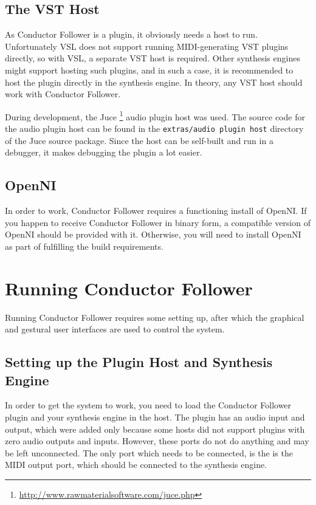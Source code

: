 \documentclass[12pt,a4paper]{article}
\newcommand{\CF}{Conductor Follower}
\begin{document}
\subsection{The VST Host}

As \CF{} is a plugin, it obviously needs a host to run.
Unfortunately VSL does not support running MIDI-generating
VST plugins directly, so with VSL,
a separate VST host is required.
Other synthesis engines might support hosting such plugins,
and in such a case,
it is recommended to host the plugin directly in the synthesis engine.
In theory, any VST host should work with \CF{}.

During development, the Juce%
\footnote{\url{http://www.rawmaterialsoftware.com/juce.php}}
audio plugin host was used.
The source code for the audio plugin host
can be found in the \texttt{extras/audio plugin host} directory
of the Juce source package.
Since the host can be self-built and run in a debugger,
it makes debugging the plugin a lot easier.

\subsection{OpenNI}

In order to work,
\CF{} requires a functioning install of OpenNI.
If you happen to receive \CF{} in binary form,
a compatible version of OpenNI should be provided with it.
Otherwise, you will need to install OpenNI
as part of fulfilling the build requirements.

\section{Running \CF{}}

Running \CF{} requires some setting up,
after which the graphical and gestural user interfaces
are used to control the system.

\subsection{Setting up the Plugin Host and Synthesis Engine}

In order to get the system to work,
you need to load the \CF{} plugin and your
synthesis engine in the host.
The plugin has an audio input and output,
which were added only because some hosts
did not support plugins with zero audio outputs and inputs.
However, these ports do not do anything and may be left unconnected.
The only port which needs to be connected,
is the is the MIDI output port,
which should be connected to the synthesis engine.
\end{document}
